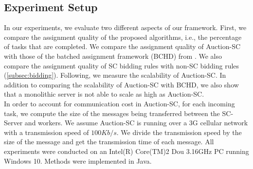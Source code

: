 

\subsection{Experiment Setup}
\label{subsec:exp_setup}

In our experiments, we evaluate two different aspects of our framework. First, we compare the assignment quality of the proposed algorithms, i.e., the percentage of tasks that are completed. We compare the assignment quality of Auction-SC with those of the batched assignment framework (BCHD) from \cite{Deng15}. We also compare the assignment quality of SC bidding rules with non-SC bidding rules (\cref{subsec:bidding}). Following, we measure the scalability of Auction-SC. In addition to comparing the scalability of Auction-SC with BCHD, we also show that a monolithic server is not able to scale as high as Auction-SC.\\

In order to account for communication cost in Auction-SC, for each incoming task, we compute the size of the messages being transferred between the SC-Server and workers. We assume Auction-SC is running over a 3G cellular network with a transmission speed of $100 Kb/s$. We divide the transmission speed by the size of the message and get the transmission time of each message. All experiments were conducted on an Intel(R) Core(TM)2 Dou 3.16GHz PC running Windows 10. Methods were implemented in Java.\\

